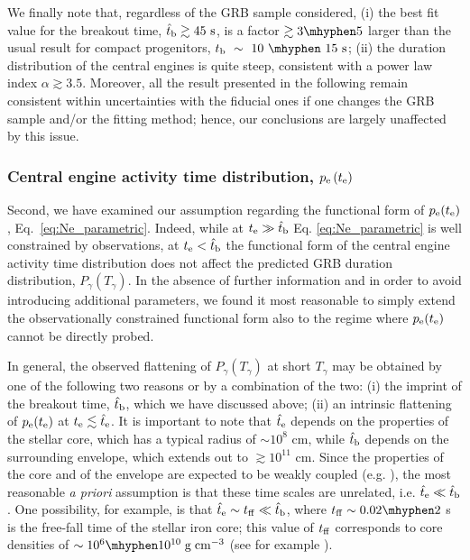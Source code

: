 \documentclass[useAMS,usenatbib]{mn2e}
\begin{document}
We finally note that, regardless of the GRB sample considered, (i) the best fit value for the breakout time, $\hat{t}_{\rm b}\gtrsim 45\text{ s}$, is a factor $\gtrsim 3\mhyphen 5$ larger than the usual result for compact progenitors, $t_{\rm b}~\sim~10~\mhyphen~15\text{ s}$; (ii) the duration distribution of the central engines is quite steep, consistent with a power law index $\alpha\gtrsim 3.5$. Moreover, all the result presented in the following remain consistent within uncertainties with the fiducial ones if one changes the GRB sample and/or the fitting method; hence, our conclusions are largely unaffected by this issue.

\subsubsection{Central engine activity time distribution, $p_{\rm e}\left(t_{\rm e}\right)$}

Second, we have examined our assumption regarding the functional form of $p_{\rm e}(t_{\rm e})$, Eq.~\eqref{eq:Ne_parametric}. Indeed, while at $t_{\rm e}\gg\hat{t}_{\rm b}$ Eq. \eqref{eq:Ne_parametric} is well constrained by observations, at $t_{\rm e}<\hat{t}_{\rm b}$ the functional form of the central engine activity time distribution does not affect the predicted GRB duration distribution, $P_\gamma\left(T_\gamma\right)$. In the absence of further information and in order to avoid introducing additional parameters, we found it most reasonable to simply extend the observationally constrained functional form also to the regime where $p_{\rm e}(t_{\rm e})$ cannot be directly probed.

In general, the observed flattening of   $P_\gamma\left(T_\gamma\right)$ at short $T_\gamma$ may be obtained by one of the following two reasons or by a combination of the two: (i) the imprint of the breakout time, $\hat{t}_{\rm b}$, which we have discussed above; (ii) an intrinsic flattening of $p_{\rm e}(t_{\rm e})$ at $t_{\rm e}\lesssim\hat{t}_{\rm e}$.
It is important to note that $\hat{t}_{\rm e}$ depends on the properties of the stellar core, which has a typical radius of $\sim 10^8\text{ cm}$, while $\hat{t}_{\rm b}$ depends on the surrounding envelope, which extends out to $\gtrsim 10^{11}\text{ cm}$. Since the properties of the core and of the envelope are expected to be weakly coupled (e.g. \citealt{Crowther2007}), the most reasonable {\it a priori} assumption is that these time scales are unrelated, i.e. $\hat{t}_{\rm e}\ll\hat{t}_{\rm b}$. One possibility, for example, is that $\hat{t}_{\rm e}\sim t_{\rm ff}\ll \hat{t}_{\rm b}$, where $t_{\rm ff}\sim 0.02\mhyphen 2\;$s is the free-fall time of the stellar iron core; this value of $t_{\rm ff}$ corresponds to core densities of $\sim 10^6\mhyphen10^{10}{\rm\;g\;cm^{-3}}$ (see for example \citealt{Janka2012,Burrows2013}).
\end{document}
